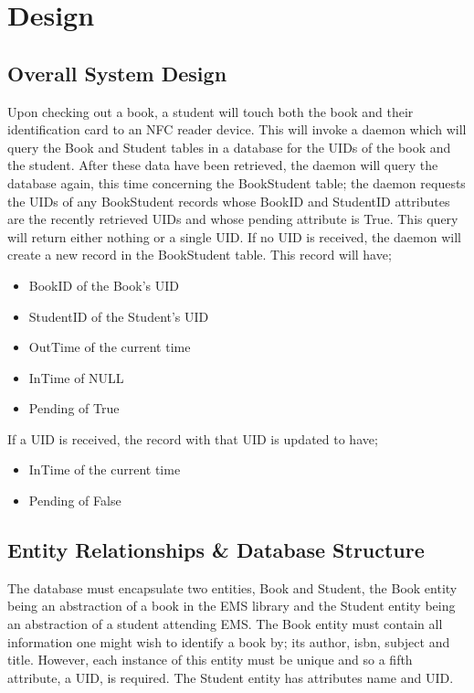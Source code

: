 \documentclass[draft]{book}
\begin{document}

\chapter{Design}

\section{Overall System Design}

Upon checking out a book, a student will touch both the book and their 
identification card to an NFC reader device. This will invoke a daemon which 
will query the Book and Student tables in a database for the UIDs of the 
book and the student. After these data have been retrieved, the daemon will 
query the database again, this time concerning the BookStudent table; the 
daemon requests the UIDs of any BookStudent records whose BookID and 
StudentID attributes are the recently retrieved UIDs and whose pending 
attribute is True. This query will return either nothing or a single UID. If 
no UID is received, the daemon will create a new record in the BookStudent 
table. This record will have;\begin{itemize}

    \item BookID of the Book's UID
    \item StudentID of the Student's UID
    \item OutTime of the current time
    \item InTime of NULL
    \item Pending of True

\end{itemize} If a UID is received, the record with that UID is updated to 
have;\begin{itemize}

    \item InTime of the current time
    \item Pending of False

\end{itemize}

\section{Entity Relationships \& Database Structure}

The database must encapsulate two entities, Book and Student, the Book 
entity being an abstraction of a book in the EMS library and the Student 
entity being an abstraction of a student attending EMS. The Book entity must 
contain all information one might wish to identify a book by; its author, 
isbn, subject and title. However, each instance of this entity must be 
unique and so a fifth attribute, a UID, is required. The Student entity has 
attributes name and UID.
\end{document}
